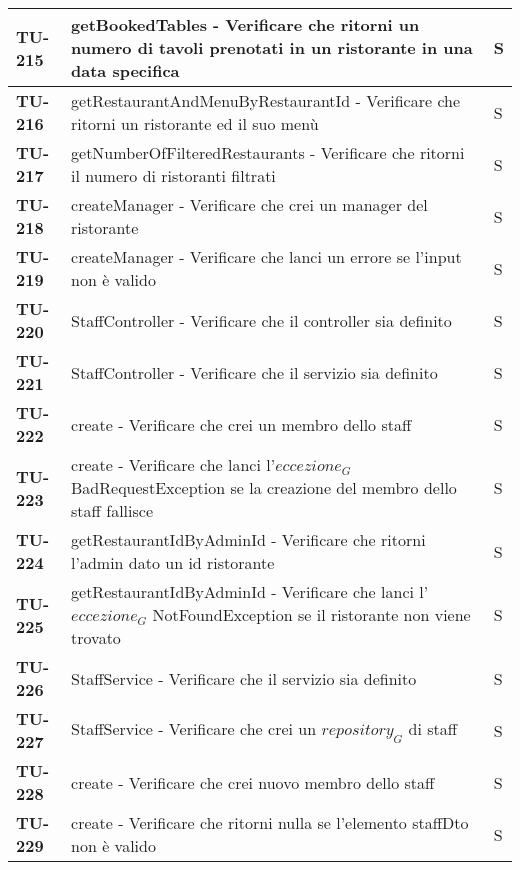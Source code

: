\begin{longtable}{|>{\centering\arraybackslash}p{2cm}|p{15cm}|p{1cm}|}
  \hline  
  \rowcolor{gray!10}
  \textbf{TU-215} & getBookedTables - Verificare che ritorni un numero di tavoli prenotati in un ristorante in una data specifica & S \\ 
  \hline  
  \rowcolor{gray!10}
  \textbf{TU-216} & getRestaurantAndMenuByRestaurantId - Verificare che ritorni un ristorante ed il suo menù & S \\ 
  \hline  
  \rowcolor{gray!10}
  \textbf{TU-217} & getNumberOfFilteredRestaurants - Verificare che ritorni il numero di ristoranti filtrati & S \\ 
  \hline  
  \rowcolor{gray!10}
  \textbf{TU-218} & createManager - Verificare che crei un manager del ristorante & S \\ 
  \hline  
  \rowcolor{gray!10}
  \textbf{TU-219} & createManager - Verificare che lanci un errore se l'input non è valido & S \\ 
  \hline  
  \rowcolor{gray!10}
  \textbf{TU-220} & StaffController - Verificare che il controller sia definito  & S \\ 
  \hline  
  \rowcolor{gray!10}
  \textbf{TU-221} & StaffController - Verificare che il servizio sia definito  & S \\ 
  \hline  
  \rowcolor{gray!10}
  \textbf{TU-222} & create - Verificare che crei un membro dello staff  & S \\ 
  \hline
  \rowcolor{gray!10}
  \textbf{TU-223} & create - Verificare che lanci l'$\textit{eccezione}_G$ BadRequestException se la creazione del membro dello staff fallisce  & S \\ 
  \hline
  \rowcolor{gray!10}
  \textbf{TU-224} & getRestaurantIdByAdminId - Verificare che ritorni l'admin dato un id ristorante  & S \\ 
  \hline
  \rowcolor{gray!10}
  \textbf{TU-225} & getRestaurantIdByAdminId - Verificare che lanci l'$\textit{eccezione}_G$ NotFoundException se il ristorante non viene trovato  & S \\ 
  \hline
  \rowcolor{gray!10}
  \textbf{TU-226} & StaffService - Verificare che il servizio sia definito  & S \\ 
  \hline
  \rowcolor{gray!10}
  \textbf{TU-227} & StaffService - Verificare che crei un $\textit{repository}_G$ di staff  & S \\ 
  \hline
  \rowcolor{gray!10}
  \textbf{TU-228} & create - Verificare che crei nuovo membro dello staff  & S \\ 
  \hline
  \rowcolor{gray!10}
  \textbf{TU-229} & create - Verificare che ritorni nulla se l'elemento staffDto non è valido  & S \\ 

\end{longtable}
